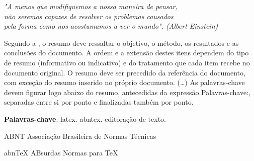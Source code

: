 \documentclass[
12pt,				%
openright,			%
oneside,			%
a4paper,			%
chapter=TITLE,		%
section=TITLE,		%
english,			%
french,				%
spanish,			%
brazil				%
]{abntex2}
\newcommand{\listofquadrosname}{Lista de quadros}
\begin{document}
	\begin{epigrafe}
		\vspace*{\fill}
		\begin{flushright}
			\textit{"A menos que modifiquemos a nossa maneira de pensar,\\ não seremos capazes de resolver os problemas causados \\ pela forma como nos acostumamos a ver o mundo". (Albert Einstein)}
		\end{flushright}
	\end{epigrafe}
	\setlength{\absparsep}{18pt} %
	\begin{resumo}
		Segundo a , o resumo deve ressaltar o
		objetivo, o método, os resultados e as conclusões do documento. A ordem e a extensão
		destes itens dependem do tipo de resumo (informativo ou indicativo) e do
		tratamento que cada item recebe no documento original. O resumo deve ser
		precedido da referência do documento, com exceção do resumo inserido no
		próprio documento. (\ldots) As palavras-chave devem figurar logo abaixo do
		resumo, antecedidas da expressão Palavras-chave:, separadas entre si por
		ponto e finalizadas também por ponto.
		
		\textbf{Palavras-chave}: latex. abntex. editoração de texto.
	\end{resumo}
	
			
			
	
	\listoffigures*
	\cleardoublepage
	\pdfbookmark[0]{\listofquadrosname}{loq}
	\listofquadros*
	\cleardoublepage
	\listoftables*
	\cleardoublepage
	\begin{siglas}
		\item[ABNT] Associação Brasileira de Normas Técnicas
		\item[abnTeX] ABsurdas Normas para TeX
	\end{siglas}
	
\end{document}
